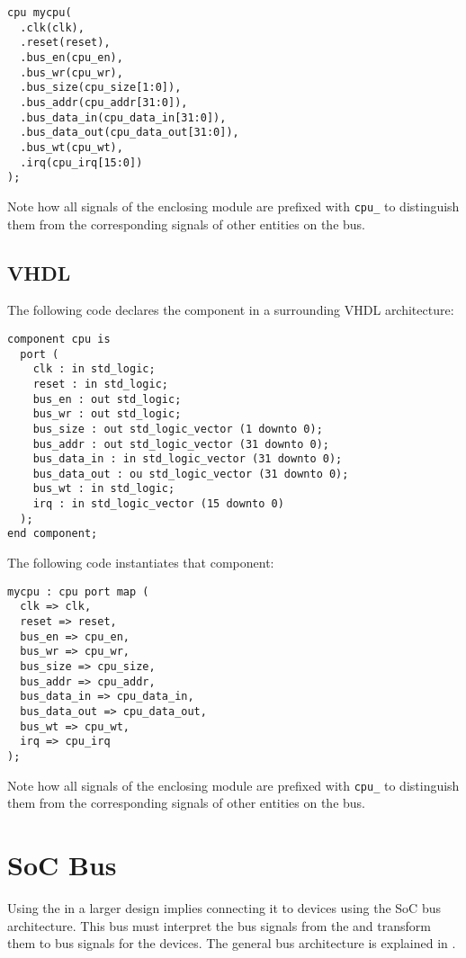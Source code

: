 \begin{verbatim}
cpu mycpu(
  .clk(clk),
  .reset(reset),
  .bus_en(cpu_en),
  .bus_wr(cpu_wr),
  .bus_size(cpu_size[1:0]),
  .bus_addr(cpu_addr[31:0]),
  .bus_data_in(cpu_data_in[31:0]),
  .bus_data_out(cpu_data_out[31:0]),
  .bus_wt(cpu_wt),
  .irq(cpu_irq[15:0])
);
\end{verbatim}

Note how all signals of the enclosing module are prefixed with {\tt cpu\_} to distinguish them from the corresponding signals of other entities on the bus.

\subsection{VHDL}

The following code declares the \eco component in a surrounding VHDL architecture:

\begin{verbatim}
component cpu is
  port (
    clk : in std_logic;
    reset : in std_logic;
    bus_en : out std_logic;
    bus_wr : out std_logic;
    bus_size : out std_logic_vector (1 downto 0);
    bus_addr : out std_logic_vector (31 downto 0);
    bus_data_in : in std_logic_vector (31 downto 0);
    bus_data_out : ou std_logic_vector (31 downto 0);
    bus_wt : in std_logic;
    irq : in std_logic_vector (15 downto 0)
  );
end component;
\end{verbatim}

The following code instantiates that component:

\begin{verbatim}
mycpu : cpu port map (
  clk => clk,
  reset => reset,
  bus_en => cpu_en,
  bus_wr => cpu_wr,
  bus_size => cpu_size,
  bus_addr => cpu_addr,
  bus_data_in => cpu_data_in,
  bus_data_out => cpu_data_out,
  bus_wt => cpu_wt,
  irq => cpu_irq
);
\end{verbatim}

Note how all signals of the enclosing module are prefixed with {\tt cpu\_} to distinguish them from the corresponding signals of other entities on the bus.

\section{SoC Bus}

Using the \eco in a larger design implies connecting it to devices using the SoC bus architecture. This bus must interpret the bus signals from the \eco and transform them to bus signals for the devices. The general bus architecture is explained in .

